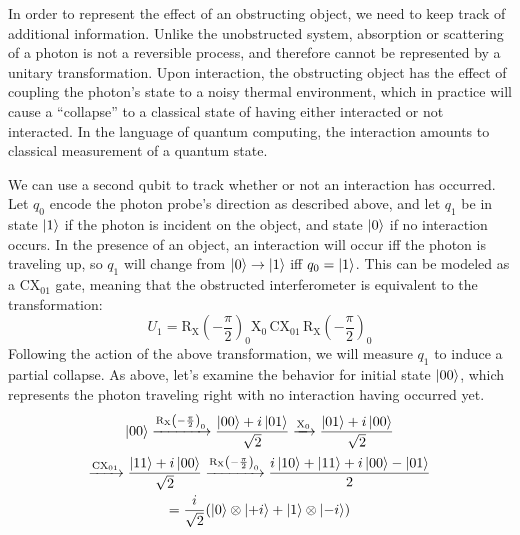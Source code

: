 \documentclass{article}
\newcommand{\X}{\text{X}}
\newcommand{\RX}{\mathrm{R_X}}
\newcommand{\CX}{\text{CX}}
\begin{document}
In order to represent the effect of an obstructing object, we need to keep track of additional information. Unlike the unobstructed system, absorption or scattering of a photon is not a reversible process, and therefore cannot be represented by a unitary transformation. Upon interaction, the obstructing object has the effect of coupling the photon's state to a noisy thermal environment, which in practice will cause a ``collapse'' to a classical state of having either interacted or not interacted. In the language of quantum computing, the interaction amounts to classical measurement of a quantum state.

We can use a second qubit to track whether or not an interaction has occurred. Let $q_0$ encode the photon probe's direction as described above, and let $q_1$ be in state $\ket 1$ if the photon is incident on the object, and state $\ket 0$ if no interaction occurs. In the presence of an object, an interaction will occur iff the photon is traveling up, so $q_1$ will change from $\ket 0 \to \ket 1$ iff $q_0 = \ket 1$. This can be modeled as a $\CX_{01}$ gate, meaning that the obstructed interferometer is equivalent to the transformation:
$$U_1 = \RX\left(-\frac{\pi}{2}\right)_0 \X_0 \, \CX_{01} \, \RX\left(-\frac{\pi}{2}\right)_0$$
Following the action of the above transformation, we will measure $q_1$ to induce a partial collapse. As above, let's examine the behavior for initial state $\ket{00}$, which represents the photon traveling right with no interaction having occurred yet.
\begin{multline} \label{eq:seq_00}
\ket{00} \xrightarrow{\RX\left(-\frac{\pi}{2}\right)_0} \frac{\ket{00} + i\ket{01}}{\sqrt{2}} \xrightarrow{\X_0} \frac{\ket{01} + i\ket{00}}{\sqrt{2}}\\
\xrightarrow{\CX_{01}} \frac{\ket{11} + i\ket{00}}{\sqrt{2}} \xrightarrow{\RX\left(-\frac{\pi}{2}\right)_0} \frac{i\ket{10} + \ket{11} + i\ket{00} - \ket{01}}{2}\\
= \frac{i}{\sqrt{2}}(\ket0 \otimes \ket{+i} + \ket1 \otimes \ket{-i})
\end{multline}
\end{document}

